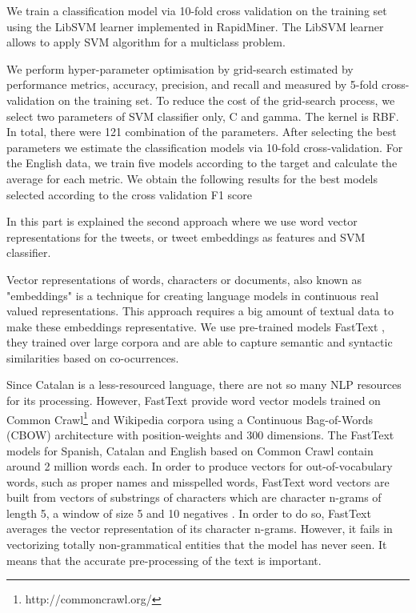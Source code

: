 \documentclass[10pt, a4paper]{article}
\begin{document}
We train a classification model via 10-fold cross validation on the training set using the LibSVM learner \cite{Fan2005} implemented in RapidMiner. The LibSVM learner allows to apply SVM algorithm for a multiclass problem. 

We perform hyper-parameter optimisation by grid-search  estimated by performance metrics, accuracy, precision, and recall and measured by 5-fold cross-validation on the training set. To reduce the cost of the grid-search process, we select two parameters of SVM classifier only, C and gamma.  The kernel is RBF.  In total, there were 121 combination of the parameters. After  selecting  the  best  parameters  we  estimate  the  classification  models  via  10-fold
cross-validation.  For the English data, we train five models according to the target and calculate the average for each metric.  We obtain the following results for the best models selected according to the cross validation F1 score

In this part is explained the second approach where we use word vector representations for the tweets, or tweet embeddings as features and SVM classifier. 

Vector representations of words, characters or documents, also known as "embeddings" is a technique for creating language models in continuous real valued representations. This approach requires a big amount of textual data to make these embeddings representative. We use pre-trained models FastText \cite{joulin-etal-2017-bag}, they trained over large corpora and are able to capture semantic and syntactic similarities based on co-ocurrences.

Since Catalan is a less-resourced language, there are not so many NLP resources for its processing. However, FastText provide word vector models trained on Common Crawl\footnote{http://commoncrawl.org/} and Wikipedia corpora using a Continuous Bag-of-Words (CBOW) architecture with position-weights and 300 dimensions. The FastText models for Spanish, Catalan and English based on Common Crawl contain around 2 million words each. In order to produce vectors for out-of-vocabulary words, such as proper names and misspelled words, FastText word vectors are built from vectors of substrings of characters which are character n-grams of length 5, a window of size 5 and 10 negatives \cite{Grave18}. In order to do so, FastText averages the vector representation of its character n-grams. However, it fails in vectorizing totally non-grammatical entities that the model has never seen. It means that the accurate pre-processing of the text is important. 
\end{document}
